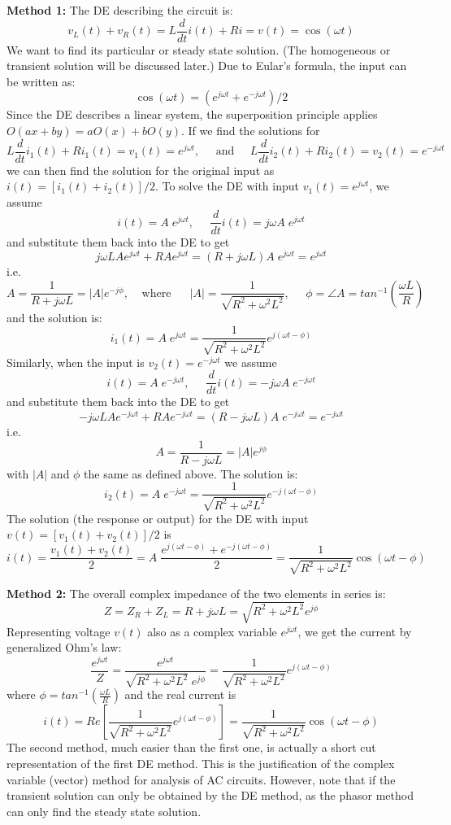 {\bf Method 1:} The DE describing the circuit is:
\[	v_L(t)+v_R(t)=L\frac{d}{dt}i(t)+Ri=v(t)=\cos(\omega t)	\]
We want to find its particular or steady state solution. (The homogeneous
or transient solution will be discussed later.) Due to Eular's formula,
the input can be written as:
\[	\cos(\omega t)=(e^{j\omega t}+e^{-j\omega t})/2	\]
Since the DE describes a linear system, the superposition principle applies
$O(ax+by)=aO(x)+bO(y)$. If we find the solutions for
\[	L\frac{d}{dt}i_1(t)+Ri_1(t)=v_1(t)=e^{j\omega t},\;\;\;\;\;
	\mbox{and}\;\;\;\;\;
	L\frac{d}{dt}i_2(t)+Ri_2(t)=v_2(t)=e^{-j\omega t}
\]
we can then find the solution for the original input as $i(t)=[i_1(t)+i_2(t)]/2$.
To solve the DE with input $v_1(t)=e^{j\omega t}$, we assume
\[ 
i(t)=A\;e^{j\omega t},\;\;\;\;\;\frac{d}{dt}i(t)=j\omega A\;e^{j\omega t} 
\]
and substitute them back into the DE to get
\[	j\omega L A e^{j\omega t}+RA e^{j\omega t}
	=(R+j\omega L)A\; e^{j\omega t}=e^{j\omega t} \]
i.e.
\[	A=\frac{1}{R+j\omega L}=|A|e^{-j\phi},\;\;\;\;\mbox{where}
	\;\;\;\;\;\;|A|=\frac{1}{\sqrt{R^2+\omega^2 L^2}},\;\;\;\;\;
	\phi=\angle A=tan^{-1}(\frac{\omega L}{R})	\]
and the solution is:
\[ i_1(t)=A\;e^{j\omega t}=\frac{1}{\sqrt{R^2+\omega^2 L^2}} 
	e^{j(\omega t-\phi)} \]
Similarly, when the input is $v_2(t)=e^{-j\omega t}$ we assume
\[ 
i(t)=A\;e^{-j\omega t},\;\;\;\;\;\frac{d}{dt}i(t)=-j\omega A\;e^{-j\omega t} 
\]
and substitute them back into the DE to get
\[	-j\omega L A e^{-j\omega t}+RA e^{-j\omega t}
	=(R-j\omega L)A\; e^{-j\omega t}=e^{-j\omega t} \]
i.e.
\[	A=\frac{1}{R-j\omega L}=|A|e^{j\phi}	\]
with $|A|$ and $\phi$ the same as defined above. The solution is:
\[ i_2(t)=A\;e^{-j\omega t}=\frac{1}{\sqrt{R^2+\omega^2 L^2}} 
	e^{-j(\omega t-\phi)} \]
The solution (the response or output) for the DE with input 
$v(t)=[v_1(t)+v_2(t)]/2$ is 
\[ 
i(t)=\frac{v_1(t)+v_2(t)}{2}=A\;\frac{e^{j(\omega t-\phi)}+e^{-j(\omega t-\phi)}}{2}
=\frac{1}{\sqrt{R^2+\omega^2 L^2}}\cos(\omega t-\phi)	\]

{\bf Method 2:}
The overall complex impedance of the two elements in series is:
\[	Z=Z_R+Z_L=R+j\omega L=\sqrt{R^2+\omega^2L^2}e^{j\phi}	\]
Representing voltage $v(t)$ also as a complex variable $e^{j\omega t}$, 
we get the current by generalized Ohm's law:
\[	\frac{e^{j\omega t}}{Z}
	=\frac{e^{j\omega t}}{\sqrt{R^2+\omega^2L^2}\;e^{j\phi}}
	=\frac{1}{\sqrt{R^2+\omega^2L^2}} e^{j(\omega t-\phi)}
\]
where $\phi=tan^{-1}(\frac{\omega L}{R})$
and the real current is
\[	i(t)=Re[\frac{1}{\sqrt{R^2+\omega^2 L^2}}e^{j(\omega t-\phi)}]
	=\frac{1}{\sqrt{R^2+\omega^2 L^2}}\cos(\omega t-\phi)	\]
The second method, much easier than the first one, is actually a short 
cut representation of the first DE method. This is the justification of
the complex variable (vector) method for analysis of AC circuits. However,
note that if the transient solution can only be obtained by the DE method,
as the phasor method can only find the steady state solution.

